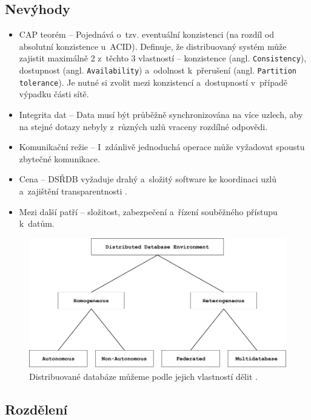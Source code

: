 \subsection{Nevýhody}
\begin{itemize}
\item CAP teorém -- Pojednává o~tzv. eventuální konzistenci (na rozdíl od absolutní konzistence u~ACID). Definuje, že distribuovaný systém může zajistit maximálně 2 z~těchto 3 vlastností -- konzistence (angl. \texttt{Consistency}), dostupnost (angl. \texttt{Availability}) a~odolnost k~přerušení (angl. \texttt{Partition tolerance}). Je nutné si zvolit mezi konzistencí a~dostupností v~případě výpadku části sítě.

\item Integrita dat -- Data musí být průběžně synchronizována na více uzlech, aby na stejné dotazy nebyly z~různých uzlů vraceny rozdílné odpovědi.

\item Komunikační režie -- I~zdánlivě jednoduchá operace může vyžadovat spoustu zbytečné komunikace.

\item Cena -- DSŘDB vyžaduje drahý a~složitý software ke koordinaci uzlů a~zajištění transparentnosti \cite{distributedDBMS}.

\item Mezi další patří -- složitost, zabezpečení a~řízení souběžného přístupu k~datům.
\end{itemize}

\begin{figure}[!h]
  \centering
  \includegraphics[width=15cm]{template-fig/DistributedDatabasesClassification.pdf}
  \caption{Distribuované databáze můžeme podle jejich vlastností dělit \cite{distributedDBMS}.}
  \label{FIG_DivDistrDB}
\end{figure}

\subsection{Rozdělení}
